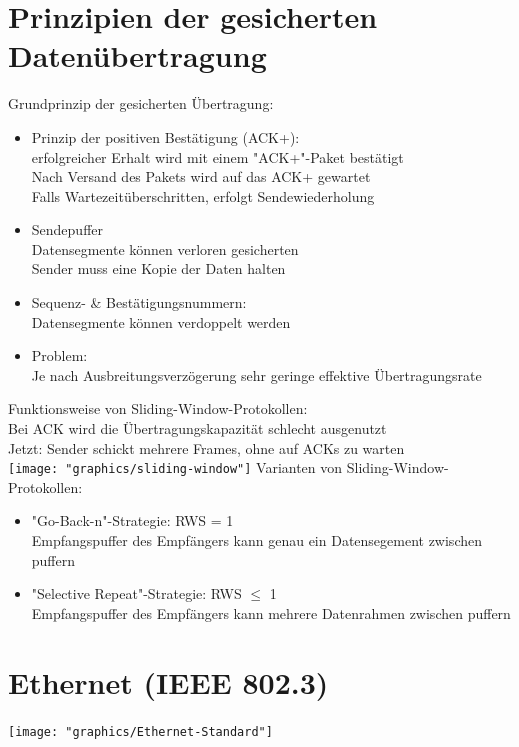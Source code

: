 \documentclass{scrreprt}
\begin{document}
\section{Prinzipien der gesicherten Datenübertragung}
Grundprinzip der gesicherten Übertragung:
\begin{itemize}
	\item Prinzip der positiven Bestätigung (ACK+):
	\\erfolgreicher Erhalt wird mit einem "ACK+"-Paket bestätigt
	\\Nach Versand des Pakets wird auf das ACK+ gewartet
	\\Falls Wartezeitüberschritten, erfolgt Sendewiederholung
	\item Sendepuffer
	\\Datensegmente können verloren gesicherten
	\\Sender muss eine Kopie der Daten halten
	\item Sequenz- \& Bestätigungsnummern:
	\\Datensegmente können verdoppelt werden
	\item Problem:
	\\Je nach Ausbreitungsverzögerung sehr geringe effektive Übertragungsrate
\end{itemize}
Funktionsweise von Sliding-Window-Protokollen:
\\Bei ACK wird die Übertragungskapazität schlecht ausgenutzt
\\Jetzt: Sender schickt mehrere Frames, ohne auf ACKs zu warten
\\\texttt{[image: "graphics/sliding-window"]}
Varianten von Sliding-Window-Protokollen:
\begin{itemize}
	\item "Go-Back-n"-Strategie: RWS = 1
	\\Empfangspuffer des Empfängers kann genau ein Datensegement zwischen puffern
	\item "Selective Repeat"-Strategie: RWS $\leq$ 1
	\\Empfangspuffer des Empfängers kann mehrere Datenrahmen zwischen puffern
\end{itemize}
\section{Ethernet (IEEE 802.3)}
\texttt{[image: "graphics/Ethernet-Standard"]}
\end{document}
